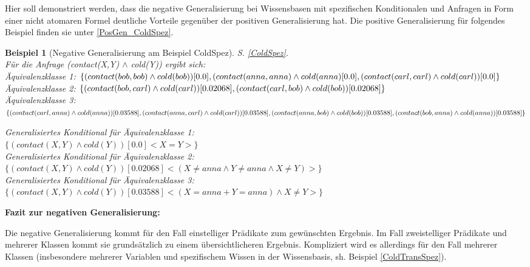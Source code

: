 \documentclass[draft]{scrreprt}
\newtheorem{Bsp}{Beispiel}[section]
\begin{document}
Hier soll demonstriert werden, dass die negative Generalisierung bei Wissensbasen mit spezifischen Konditionalen und Anfragen in Form einer nicht atomaren Formel deutliche Vorteile gegenüber der positiven Generalisierung hat. Die positive Generalisierung für folgendes Beispiel finden sie unter \ref{PosGen_ColdSpez}. 
\begin{Bsp}[Negative Generalisierung am Beispiel ColdSpez]
	 S. \ref{ColdSpez}.\\
	Für die Anfrage (contact(X,Y) $\land$ cold(Y)) ergibt sich:\\
	
	\noindent
	Äquivalenzklasse 1: $  \{(contact(bob,bob) \land cold(bob))[0.0], (contact(anna,anna) \land\\ cold(anna)[0.0],\\ (contact(carl,carl) \land cold(carl))[0.0] \} $\\
	Äquivalenzklasse 2: $ \{(contact(bob,carl) \land cold(carl))[0.02068],\\ (contact(carl,bob) \land cold(bob))[0.02068] \}$\\
	Äquivalenzklasse 3:  $ \{(contact(carl,anna) \land cold(anna))[0.03588], \\ (contact(anna, carl) \land cold(carl))[0.03588], (contact(anna,bob) \land cold(bob))[0.03588],\\ (contact(bob,anna) \land cold(anna))[0.03588]\}$
	
	\noindent
		Generalisiertes Konditional für Äquivalenzklasse 1:\\ $ \{ (contact(X,Y) \land cold(Y))[0.0]<X=Y>\} $\\
	Generalisiertes Konditional für Äquivalenzklasse 2:\\ $ \{ (contact(X,Y) \land cold(Y))[0.02068]<(X \neq anna \land Y\neq anna \land X \neq Y)>\} $\\
		Generalisiertes Konditional für Äquivalenzklasse 3: \\$ \{ (contact(X,Y) \land cold(Y))[0.03588]<(X=anna + Y=anna) \land  X \neq Y>\} $\\
	
	
\end{Bsp}

\textbf{{\large Fazit zur negativen Generalisierung:}} \label{Fazit neg Gen} 

\noindent
Die negative Generalisierung kommt für den Fall einstelliger Prädikate zum gewünschten Ergebnis. Im Fall zweistelliger Prädikate und mehrerer Klassen kommt sie grundsätzlich zu einem übersichtlicheren Ergebnis. Kompliziert wird es allerdings für den Fall mehrerer Klassen (insbesondere mehrerer Variablen und spezifischem Wissen in der Wissensbasis, sh. Beispiel \ref{ColdTransSpez}).
\end{document}
